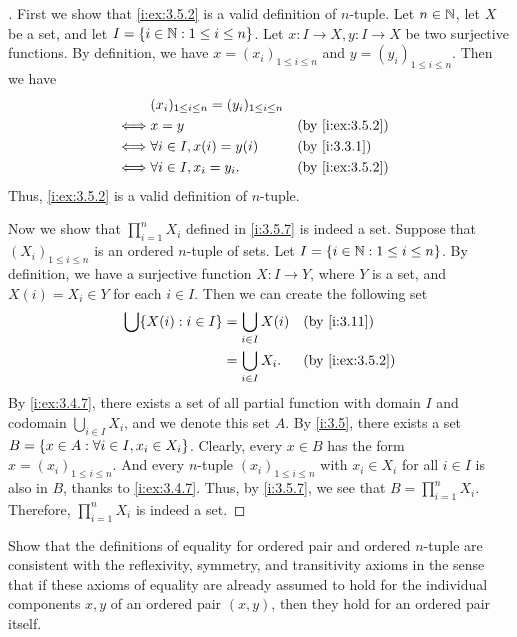 \begin{proof}[]
  First we show that \cref{i:ex:3.5.2} is a valid definition of \(n\)-tuple.
  Let \(n \in \mathbb{N}\), let \(X\) be a set, and let \(I = \left\lbrace i \in \mathbb{N} : 1 \leq i \leq n\right\rbrace\).
  Let \(x : I \to X, y : I \to X\) be two surjective functions.
  By definition, we have \(x = (x_i)_{1 \leq i \leq n}\) and \(y = (y_i)_{1 \leq i \leq n}\).
  Then we have
  \begin{align*}
         & (x_i)_{1 \leq i \leq n} = (y_i)_{1 \leq i \leq n}                      \\
    \iff & x = y                                             &  & \by{i:ex:3.5.2} \\
    \iff & \forall i \in I, x(i) = y(i)                      &  & \by{i:3.3.1}    \\
    \iff & \forall i \in I, x_i = y_i.                       &  & \by{i:ex:3.5.2}
  \end{align*}
  Thus, \cref{i:ex:3.5.2} is a valid definition of \(n\)-tuple.

  Now we show that \(\prod_{i = 1}^n X_i\) defined in \cref{i:3.5.7} is indeed a set.
  Suppose that \((X_i)_{1 \leq i \leq n}\) is an ordered \(n\)-tuple of sets.
  Let \(I = \left\lbrace i \in \mathbb{N} : 1 \leq i \leq n\right\rbrace\).
  By definition, we have a surjective function \(X : I \to Y\), where \(Y\) is a set, and \(X(i) = X_i \in Y\) for each \(i \in I\).
  Then we can create the following set
  \begin{align*}
    \bigcup \set{X(i) : i \in I} & = \bigcup_{i \in I} X(i) &  & \by{i:3.11}     \\
                                 & = \bigcup_{i \in I} X_i. &  & \by{i:ex:3.5.2}
  \end{align*}
  By \cref{i:ex:3.4.7}, there exists a set of all partial function with domain \(I\) and codomain \(\bigcup_{i \in I} X_i\), and we denote this set \(A\).
  By \cref{i:3.5}, there exists a set \(B = \left\lbrace x \in A : \forall i \in I, x_i \in X_i\right\rbrace\).
  Clearly, every \(x \in B\) has the form \(x = (x_i)_{1 \leq i \leq n}\).
  And every \(n\)-tuple \((x_i)_{1 \leq i \leq n}\) with \(x_i \in X_i\) for all \(i \in I\) is also in \(B\), thanks to \cref{i:ex:3.4.7}.
  Thus, by \cref{i:3.5.7}, we see that \(B = \prod_{i = 1}^n X_i\).
  Therefore, \(\prod_{i = 1}^n X_i\) is indeed a set.
\end{proof}

\begin{ex}\label{i:ex:3.5.3}
  Show that the definitions of equality for ordered pair and ordered \(n\)-tuple are consistent with the reflexivity, symmetry, and transitivity axioms in the sense that if these axioms of equality are already assumed to hold for the individual components \(x, y\) of an ordered pair \((x, y)\), then they hold for an ordered pair itself.
\end{ex}

